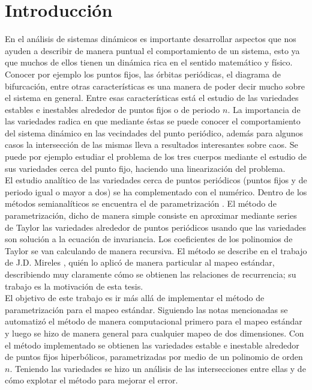
\chapter{Introducción}
En el análisis de sistemas dinámicos es importante desarrollar aspectos que nos ayuden a describir de manera puntual el comportamiento de un sistema, esto ya que muchos de ellos tienen un dinámica rica en el sentido matemático y físico. Conocer por ejemplo los puntos fijos, las órbitas periódicas, el diagrama de bifurcación, entre otras características es una manera de poder decir mucho sobre el sistema en general. Entre esas características está el estudio de las variedades estables e inestables alrededor de puntos fijos o de periodo $n$. La importancia de las variedades radica en que mediante éstas se puede conocer el comportamiento del sistema dinámico en las vecindades del punto periódico, además para algunos casos la intersección de las mismas lleva a resultados interesantes sobre caos. Se puede por ejemplo estudiar el problema de los tres cuerpos mediante el estudio de sus variedades cerca del punto fijo, haciendo una linearización del problema.\\


El estudio analítico de las variedades cerca de puntos periódicos (puntos fijos y de periodo igual o mayor a dos) se ha complementado con el numérico. Dentro de los métodos semianalíticos se encuentra el de parametrización \citep{Haro}. El método de parametrización, dicho de manera simple consiste en aproximar mediante series de Taylor las variedades alrededor de puntos periódicos usando que las variedades son solución a la ecuación de invariancia. Los coeficientes de los polinomios de Taylor se van calculando de manera recursiva. El método se describe en el trabajo de J.D. Mireles \citep{Mireles}, quién  lo aplicó de manera particular al mapeo estándar, describiendo muy claramente cómo se obtienen las relaciones de recurrencia; su trabajo es la motivación de esta tesis.\\


El objetivo de este trabajo es ir más allá de implementar el método de parametrización para el mapeo estándar. Siguiendo las notas mencionadas se automatizó el método de manera computacional primero para el mapeo estándar y luego se hizo de manera general para cualquier mapeo de dos dimensiones. Con el método implementado se obtienen las variedades estable e inestable alrededor de puntos fijos hiperbólicos, parametrizadas por medio de un polinomio de orden $n$.
Teniendo las variedades se hizo un análisis de las intersecciones entre ellas y de cómo explotar el método para mejorar el error.
 
